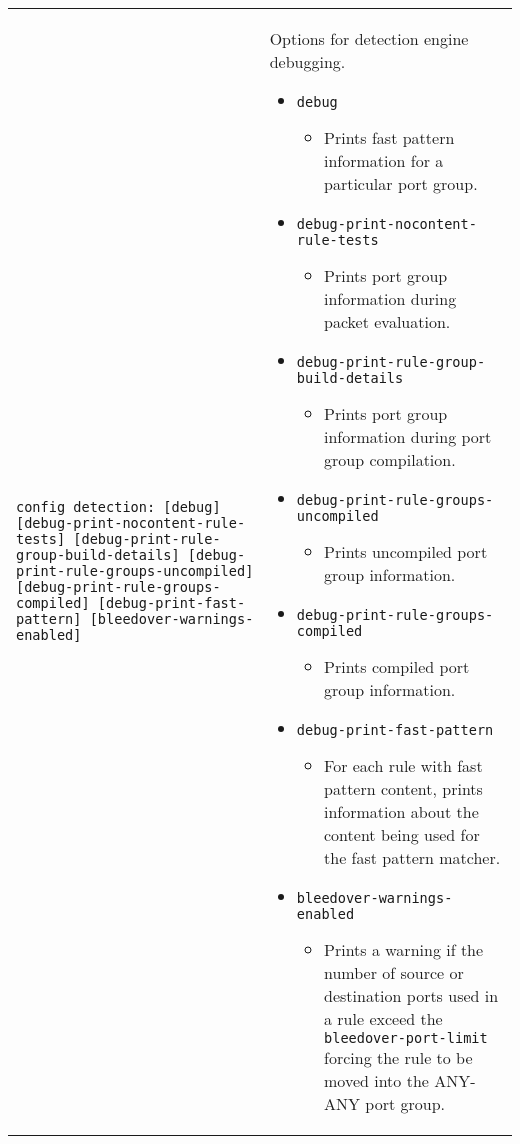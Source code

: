 \documentclass[english]{report}
\begin{document}
\begin{center}
\begin{longtable}[t]{| p{2.5in} | p{3.5in} |}
\hline
\texttt{config detection: [debug] [debug-print-nocontent-rule-tests] [debug-print-rule-group-build-details] [debug-print-rule-groups-uncompiled] [debug-print-rule-groups-compiled] [debug-print-fast-pattern] [bleedover-warnings-enabled]} & Options for detection engine debugging.
\begin{itemize}
\item \texttt{debug}
\begin{itemize}
\item Prints fast pattern information for a particular port group.
\end{itemize}
\item \texttt{debug-print-nocontent-rule-tests}
\begin{itemize}
\item Prints port group information during packet evaluation.
\end{itemize}
\item \texttt{debug-print-rule-group-build-details}
\begin{itemize}
\item Prints port group information during port group compilation.
\end{itemize}
\item \texttt{debug-print-rule-groups-uncompiled}
\begin{itemize}
\item Prints uncompiled port group information.
\end{itemize}
\item \texttt{debug-print-rule-groups-compiled}
\begin{itemize}
\item Prints compiled port group information.
\end{itemize}
\item \texttt{debug-print-fast-pattern}
\begin{itemize}
\item For each rule with fast pattern content, prints information about the content
being used for the fast pattern matcher.
\end{itemize}
\item \texttt{bleedover-warnings-enabled}
\begin{itemize}
\item Prints a warning if the number of source or destination ports used in a
rule exceed the \texttt{bleedover-port-limit} forcing the rule to be moved into
the ANY-ANY port group.
\end{itemize}
\end{itemize} \\


\end{longtable}
\end{center}
\end{document}
